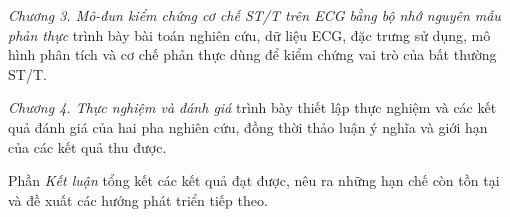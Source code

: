 \textit{Chương 3. Mô-đun kiểm chứng cơ chế ST/T trên ECG bằng bộ nhớ nguyên mẫu phản thực} trình bày bài toán nghiên cứu, dữ liệu ECG, đặc trưng sử dụng, mô hình phân tích và cơ chế phản thực dùng để kiểm chứng vai trò của bất thường ST/T.

\textit{Chương 4. Thực nghiệm và đánh giá} trình bày thiết lập thực nghiệm và các kết quả đánh giá của hai pha nghiên cứu, đồng thời thảo luận ý nghĩa và giới hạn của các kết quả thu được.

Phần \textit{Kết luận} tổng kết các kết quả đạt được, nêu ra những hạn chế còn tồn tại và đề xuất các hướng phát triển tiếp theo.

\renewcommand{\thefigure}{\thechapter.\arabic{figure}}
\renewcommand{\thetable}{\thechapter.\arabic{table}}
